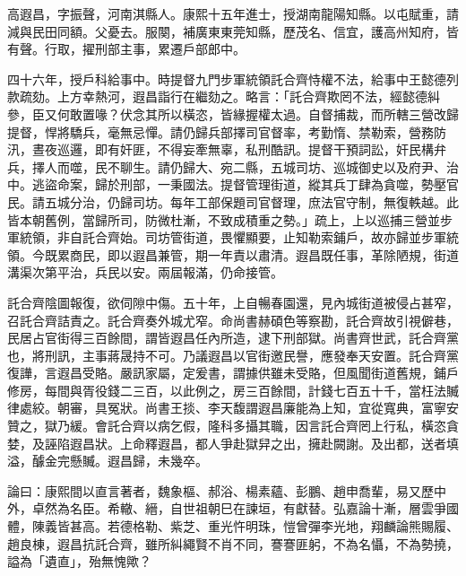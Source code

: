 \begin{pinyinscope}
高遐昌，字振聲，河南淇縣人。康熙十五年進士，授湖南龍陽知縣。以屯賦重，請減與民田同額。父憂去。服闋，補廣東東莞知縣，歷茂名、信宜，護高州知府，皆有聲。行取，擢刑部主事，累遷戶部郎中。

四十六年，授戶科給事中。時提督九門步軍統領託合齊恃權不法，給事中王懿德列款疏劾。上方幸熱河，遐昌詣行在繼劾之。略言：「託合齊欺罔不法，經懿德糾參，臣又何敢置喙？伏念其所以橫恣，皆緣握權太過。自督捕裁，而所轄三營改歸提督，悍將驕兵，毫無忌憚。請仍歸兵部擇司官督率，考勤惰、禁勒索，營務防汛，晝夜巡邏，即有奸匪，不得妄牽無辜，私刑酷訊。提督干預詞訟，奸民構弁兵，擇人而噬，民不聊生。請仍歸大、宛二縣，五城司坊、巡城御史以及府尹、治中。逃盜命案，歸於刑部，一秉國法。提督管理街道，縱其兵丁肆為貪噬，勢壓官民。請五城分治，仍歸司坊。每年工部保題司官督理，庶法官守制，無復軼越。此皆本朝舊例，當歸所司，防微杜漸，不致成積重之勢。」疏上，上以巡捕三營並步軍統領，非自託合齊始。司坊管街道，畏懼顯要，止知勒索鋪戶，故亦歸並步軍統領。今既累商民，即以遐昌兼管，期一年責以肅清。遐昌既任事，革除陋規，街道溝渠次第平治，兵民以安。兩屆報滿，仍命接管。

託合齊陰圖報復，欲伺隙中傷。五十年，上自暢春園還，見內城街道被侵占甚窄，召託合齊詰責之。託合齊奏外城尤窄。命尚書赫碩色等察勘，託合齊故引視僻巷，民居占官街得三百餘間，謂皆遐昌任內所造，逮下刑部獄。尚書齊世武，託合齊黨也，將刑訊，主事蔣晟持不可。乃議遐昌以官街邀民譽，應發奉天安置。託合齊黨復譁，言遐昌受賂。嚴訊家屬，定爰書，謂據供雖未受賂，但風聞街道舊規，鋪戶修房，每間與胥役錢二三百，以此例之，房三百餘間，計錢七百五十千，當枉法贓律處絞。朝審，具冤狀。尚書王掞、李天馥謂遐昌廉能為上知，宜從寬典，富寧安贊之，獄乃緩。會託合齊以病乞假，隆科多攝其職，因言託合齊罔上行私，橫恣貪婪，及誣陷遐昌狀。上命釋遐昌，都人爭赴獄舁之出，擁赴闕謝。及出都，送者填溢，醵金完懸贓。遐昌歸，未幾卒。

論曰：康熙間以直言著者，魏象樞、郝浴、楊素蘊、彭鵬、趙申喬輩，易又歷中外，卓然為名臣。希轍、縉，自世祖朝巳在諫垣，有獻替。弘嘉論十漸，層雲爭國體，陳義皆甚高。若德格勒、紫芝、重光忤明珠，愷曾彈李光地，翔麟論熊賜履、趙良棟，遐昌抗託合齊，雖所糾繩賢不肖不同，謇謇匪躬，不為名懾，不為勢撓，謚為「遺直」，殆無愧歟？


\end{pinyinscope}